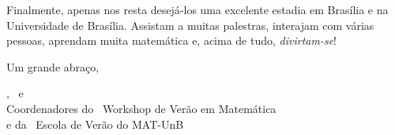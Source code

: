 Finalmente, apenas nos resta desej\'{a}-los uma excelente estadia em Bras\'{i}lia e na Universidade de Bras\'{i}lia. Assistam a muitas palestras, interajam com v\'{a}rias pessoas, aprendam muita matem\'{a}tica e, acima de tudo, \textit{\sc divirtam-se}!

\vspace{24pt}

Um grande abra\c{c}o,

\vspace{24pt}

\begin{center}
	\coordgeral, \coordgerali\ e \coordgeralii\\ 
	Coordenadores do \edworkshop\ Workshop de Ver\~{a}o em Matem\'{a}tica\\
	e da \edverao\ Escola de Ver\~{a}o do MAT-UnB
\end{center}



\restoregeometry